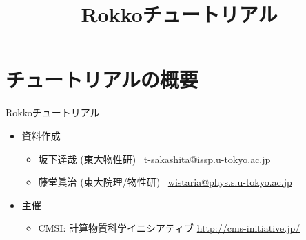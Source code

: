 \title{Rokkoチュートリアル}

\newtheorem{rei}{例}
\renewcommand{\therei}{}
\newcommand{\smallscr}[1]{\scalebox{0.4}{$#1$}}
\newcommand{\middlescr}[1]{\scalebox{0.60}{$#1$}}

\newlength\savedwidth
\newcommand\whline{%
    \noalign{\xdef\origarrayrulewidth{\the\arrayrulewidth}%
    \global\arrayrulewidth 3\arrayrulewidth}%
    \hline%
    \noalign{\global\arrayrulewidth\origarrayrulewidth}%
}

\AtBeginSection[]{
    \begin{frame}
        \tableofcontents[currentsection]
    \end{frame}
}




\begin{frame}
  \titlepage
\end{frame}


\section{チュートリアルの概要}

\begin{frame}{Rokkoチュートリアル}
  \begin{itemize}
  \item 資料作成
    \setlength{\itemsep}{1em}
    \begin{itemize}
      \setlength{\itemsep}{1em}
    \item 坂下達哉 (東大物性研) \ \href{mailto:t-sakashita@issp.u-tokyo.ac.jp}{t-sakashita@issp.u-tokyo.ac.jp}
    \item 藤堂眞治 (東大院理/物性研) \ \href{mailto:wistaria@phys.s.u-tokyo.ac.jp}{wistaria@phys.s.u-tokyo.ac.jp}
    \end{itemize}
  \item 主催
    \begin{itemize}
    \item CMSI: 計算物質科学イニシアティブ \url{http://cms-initiative.jp/}
    \end{itemize}
  \end{itemize}
\end{frame}

